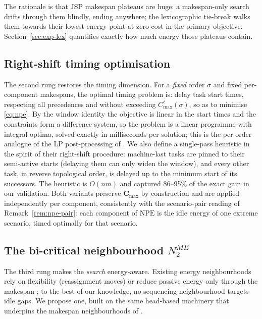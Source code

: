 \documentclass[preprint,12pt]{elsarticle}
\newcommand{\NPE}{\mathrm{NPE}}
\begin{document}
The rationale is that JSP makespan plateaus are huge: a makespan-only
search drifts through them blindly, ending anywhere; the lexicographic
tie-break walks them towards their lowest-energy point at zero cost in the
primary objective. Section~\ref{sec:exp-lex} quantifies exactly how much
energy those plateaus contain.

\subsection{Right-shift timing optimisation}
\label{sec:rs}

The second rung restores the timing dimension. For a \emph{fixed} order
$\sigma$ and fixed per-component makespans, the optimal timing problem is:
delay task start times, respecting all precedences and without exceeding
$C^i_{\max}(\sigma)$, so as to minimise \eqref{eq:npe}. By the window
identity the objective is linear in the start times and the constraints
form a difference system, so the problem is a linear programme with
integral optima, solved exactly in milliseconds per solution; this is the
per-order analogue of the LP post-processing of \cite{Afsar2022}. We also
define a single-pass heuristic in the spirit of their right-shift
procedure: machine-last tasks are pinned to their semi-active starts
(delaying them can only widen the window), and every other task, in
reverse topological order, is delayed up to the minimum start of its
successors. The heuristic is $O(nm)$ and captured 86--95\% of the exact
gain in our validation. Both variants preserve
$\mathbf{C}_{\max}$ by construction and are applied independently per
component, consistently with the scenario-pair reading of
Remark~\ref{rem:npe-pair}: each component of $\mathbf{\NPE}$ is the idle
energy of one extreme scenario, timed optimally for that scenario.

\subsection{The bi-critical neighbourhood $N_2^{ME}$}
\label{sec:n2me}

The third rung makes the \emph{search} energy-aware. Existing energy
neighbourhoods rely on flexibility (reassignment moves) or reduce passive
energy only through the makespan \cite{GarciaGomez2023}; to the best of our
knowledge, no sequencing neighbourhood targets idle gaps. We propose one,
built on the same head-based machinery that underpins the makespan
neighbourhoods of \cite{DiazTabu2026}.
\end{document}
